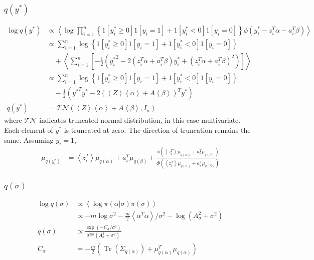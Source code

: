 \documentclass[11pt]{article}
\DeclareMathOperator{\Tr}{Tr}
\begin{document}
\subsubsection{$q\left(y^{*}\right)$}
\begin{align*}
  \log q\left(y^{*}\right) &\propto \left\langle \log \prod_{i=1}^{n}\left\{1\left[y_{i}^{*}\ge 0\right]1\left[y_{i}=1\right] + 1\left[y_{i}^{*}<0\right]1\left[y_{i}=0\right] \right\}\phi\left(y_{i}^{*}-z_{i}^{T}\alpha -a_{i}^{T}\beta\right) \right\rangle \\
  &\propto \sum_{i=1}^{n}\log\left\{1\left[y_{i}^{*}\ge 0\right]1\left[y_{i}=1\right] + 1\left[y_{i}^{*}<0\right]1\left[y_{i}=0\right] \right\} \\
  &\quad + \left\langle\sum_{i=1}^{n}\left[-\frac{1}{2}\left({y_{i}^{*}}^{2} -2\left(z_{i}^{T}\alpha +a_{i}^{T}\beta\right)y_{i}^{*} +\left(z_{i}^{T}\alpha +a_{i}^{T}\beta\right)^{2}\right) \right] \right\rangle\\
  &\propto \sum_{i=1}^{n}\log\left\{1\left[y_{i}^{*}\ge 0\right]1\left[y_{i}=1\right] + 1\left[y_{i}^{*}<0\right]1\left[y_{i}=0\right] \right\} \\
  &\quad -\frac{1}{2}\left({y^{*}}^{T}y^{*} -2\left(\left\langle Z\right\rangle \left\langle \alpha\right\rangle +A\left\langle\beta\right\rangle \right)^{T}y^{*}\right)\\
  q\left(y^{*}\right) &= \mathcal{TN}\left(\left\langle Z\right\rangle \left\langle \alpha\right\rangle +A\left\langle\beta\right\rangle, I_{n}\right)
\end{align*}
where $\mathcal{TN}$ indicates truncated normal distribution, in this case multivariate. Each element of $y^{*}$ is truncated at zero. The direction of truncation remains the same. Assuming $y_{i}=1$,
\begin{align*}
  \mu_{q\left(y_{i}^{*}\right)} &= \left\langle z_{i}^{T}\right\rangle \mu_{q\left(\alpha\right)} + a_{i}^{T}\mu_{q\left(\beta\right)} + \frac{\phi\left(\left\langle z_{i}^{T}\right\rangle \mu_{q\left(\alpha\right)} + a_{i}^{T}\mu_{q\left(\beta\right)}\right)}{\Phi\left(\left\langle z_{i}^{T}\right\rangle \mu_{q\left(\alpha\right)} + a_{i}^{T}\mu_{q\left(\beta\right)}\right)}
\end{align*}
\subsubsection{$q\left(\sigma\right)$}
\begin{align*}
  \log q\left(\sigma\right) &\propto \left\langle \log \pi\left(\alpha|\sigma\right)\pi\left(\sigma\right) \right\rangle\\
  &\propto -m\log \sigma^{2} -\frac{m}{2}\left\langle \alpha^{T}\alpha \right\rangle /\sigma^{2} -\log \left(A_{\sigma}^{2} +\sigma^{2}\right)\\
  q\left(\sigma\right) &\propto \frac{\exp \left(-C_{\sigma}/\sigma^{2}\right)}{\sigma^{2m}\left(A_{\sigma}^{2}+\sigma^{2}\right)}\\
  C_{\sigma} &= -\frac{m}{2}\left(\Tr\left(\Sigma_{q\left(\alpha\right)}\right) + \mu_{q\left(\alpha\right)}^{T}\mu_{q\left(\alpha\right)}\right)
\end{align*}
\end{document}
